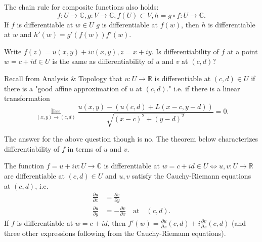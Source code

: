 The chain rule for composite functions also holds:
\[
    f:U\to\mathbb{C},g:V\to \mathbb{C},f(U)\subset V,h=g\circ f:U \to \mathbb{C}.
\]
If \(f\) is differentiable at \(w \in U\) \(g\) is differentiable at \(f(w)\), then \(h\) is differentiable at \(w\) and \(h'(w)=g'(f(w))f'(w)\).

\begin{problem}
    Write \(f(z) = u(x,y)+iv(x,y),z=x+iy\). Is differentiability of \(f\) at a point \(w = c + id \in U\) is the same as differentiability of \(u\) and \(v\) at \((c,d)\)?
\end{problem}

Recall from Analysis \& Topology that \(u: U \to \mathbb{R}\) is differentiable at \((c,d)\in U\) if there is a "good affine approximation of \(u\) at \((c,d)\)." i.e. if there is a linear transformation
\[
    \lim\limits_{(x,y) \to (c,d)} \frac{u(x,y) - (u(c,d) + L(x-c,y-d))}{\sqrt{(x-c)^2 + (y-d)^2}} = 0.
\]

The answer for the above question though is no. The theorem below characterizes differentiability of \(f\) in terms of \(u\) and \(v\).

\begin{theorem}
    The function \(f = u + iv:U\to \mathbb{C}\) is differentiable at \(w = c + id \in U \iff  u,v: U \to \mathbb{R}\) are differentiable at \((c,d) \in U\) and \(u, v\) satisfy the Cauchy-Riemann equations at \((c,d)\), i.e.
    \begin{align*}
        \frac{\partial u}{\partial x} &= \frac{\partial v}{\partial y}\\
        \frac{\partial u}{\partial y} &= - \frac{\partial v}{\partial x}\quad\text{at}\quad(c,d).
    \end{align*}
    If \(f\) is differentiable at \(w = c + id\), then \(f'(w) = \frac{\partial u}{\partial x} (c,d) + i \frac{\partial v}{\partial x} (c,d)\) (and three other expressions following from the Cauchy-Riemann equations).
\end{theorem}

